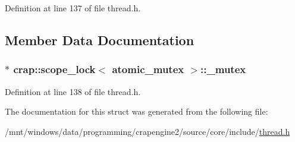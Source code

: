 Definition at line 137 of file thread.\+h.



\subsection{Member Data Documentation}
\hypertarget{structcrap_1_1scope__lock_3_01atomic__mutex_01_4_a84842a0c0f70416a6b5276469ec292ce}{
\subsubsection[{\+\_\+mutex}]{$\ast$ {\bf crap\+::scope\+\_\+lock}$<$ {\bf atomic\+\_\+mutex} $>$\+::\+\_\+mutex}}\label{structcrap_1_1scope__lock_3_01atomic__mutex_01_4_a84842a0c0f70416a6b5276469ec292ce}


Definition at line 138 of file thread.\+h.



The documentation for this struct was generated from the following file\+:\begin{DoxyCompactItemize}
\item 
/mnt/windows/data/programming/crapengine2/source/core/include/\hyperlink{thread_8h}{thread.\+h}\end{DoxyCompactItemize}
